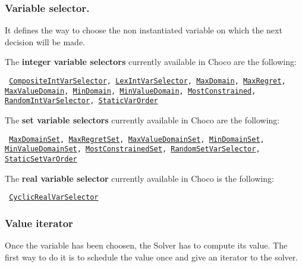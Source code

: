 \subsubsection{Variable selector.}\label{solver:variableselector}\hypertarget{solver:variableselector}{}
It defines the way to choose the non instantiated variable on which the next decision will be made.

\noindent The \textbf{integer variable selectors} currently available in Choco are the following: 
\begin{notedef}\tt
\hyperlink{compositeintvarselector:compositeintvarselectorvarselector}{CompositeIntVarSelector}, \hyperlink{lexintvarselector:lexintvarselectorvarselector}{LexIntVarSelector}, \hyperlink{maxdomain:maxdomainvarselector}{MaxDomain}, \hyperlink{maxregret:maxregretvarselector}{MaxRegret}, \hyperlink{maxvaldomain:maxvaldomainvarselector}{MaxValueDomain}, \hyperlink{mindomain:mindomainvarselector}{MinDomain}, \hyperlink{minvaldomain:minvaldomainvarselector}{MinValueDomain}, \hyperlink{mostconstrained:mostconstrainedvarselector}{MostConstrained},  \hyperlink{randomvarint:randomvarintvarselector}{RandomIntVarSelector},  \hyperlink{staticvarorder:staticvarordervarselector}{StaticVarOrder}
\end{notedef}

\noindent The \textbf{set variable selectors} currently available in Choco are the following: 
\begin{notedef}\tt
\hyperlink{maxdomset:maxdomsetvarselector}{MaxDomainSet}, \hyperlink{maxregretset:maxregretsetvarselector}{MaxRegretSet}, \hyperlink{maxvaldomainset:maxvaldomainsetvarselector}{MaxValueDomainSet}, \hyperlink{mindomset:mindomsetvarselector}{MinDomainSet}, \hyperlink{minvaldomainset:minvaldomainsetvarselector}{MinValueDomainSet}, \hyperlink{mostconstrainedset:mostconstrainedsetvarselector}{MostConstrainedSet},  \hyperlink{randomvarset:randomvarsetvarselector}{RandomSetVarSelector},  \hyperlink{staticsetvarorder:staticsetvarordervarselector}{StaticSetVarOrder}
\end{notedef}

\noindent The \textbf{real variable selector} currently available in Choco is the following: 
\begin{notedef}\tt
\hyperlink{cyclicrealvarselector:cyclicrealvarselectorvarselector}{CyclicRealVarSelector}
\end{notedef}

\subsubsection{Value iterator}\label{solver:valueiterator}\hypertarget{solver:valueiterator}{}
Once the variable has been choosen, the Solver has to compute its value. The first way to do it is to schedule the value once and give an iterator to the solver.

